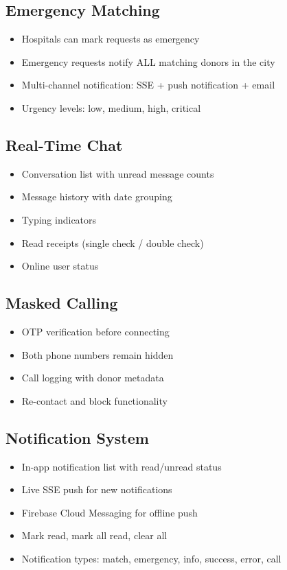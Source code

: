\documentclass[12pt,a4paper]{article}
\begin{document}
\subsection{Emergency Matching}

\begin{itemize}[leftmargin=*]
    \item Hospitals can mark requests as emergency
    \item Emergency requests notify ALL matching donors in the city
    \item Multi-channel notification: SSE + push notification + email
    \item Urgency levels: low, medium, high, critical
\end{itemize}

\subsection{Real-Time Chat}

\begin{itemize}[leftmargin=*]
    \item Conversation list with unread message counts
    \item Message history with date grouping
    \item Typing indicators
    \item Read receipts (single check / double check)
    \item Online user status
\end{itemize}

\subsection{Masked Calling}

\begin{itemize}[leftmargin=*]
    \item OTP verification before connecting
    \item Both phone numbers remain hidden
    \item Call logging with donor metadata
    \item Re-contact and block functionality
\end{itemize}

\subsection{Notification System}

\begin{itemize}[leftmargin=*]
    \item In-app notification list with read/unread status
    \item Live SSE push for new notifications
    \item Firebase Cloud Messaging for offline push
    \item Mark read, mark all read, clear all
    \item Notification types: match, emergency, info, success, error, call
\end{itemize}
\end{document}
